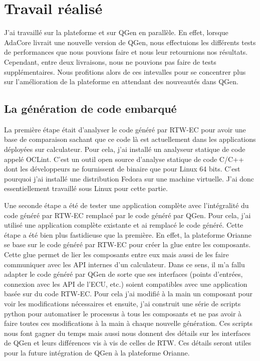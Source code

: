 \chapter{Travail réalisé}
J'ai travaillé sur la plateforme et sur QGen en parallèle.
En effet, lorsque AdaCore livrait une nouvelle version de QGen, nous effectuions
les différents tests de performances que nous pouvions faire et nous leur
retournions nos résultats. Cependant, entre deux livraisons, nous ne pouvions pas
faire de tests supplémentaires. Nous profitions alors de ces intevalles pour se
concentrer plus sur l'amélioration de la plateforme en attendant des nouveautés
dans QGen.

\section{La génération de code embarqué}
La première étape était d'analyser le code généré par RTW-EC\up{\circledR} pour
avoir une base de comparaison sachant que ce code là est actuellement dans les
applications déployées sur calculateur.
Pour cela, j'ai installé un analyseur statique de code appelé OCLint. C'est un
outil open source d'analyse statique de code C/C++ dont les développeurs ne
fournissent de binaire que
pour Linux 64 bits. C'est pourquoi j'ai installé une distribution Fedora sur une machine
virtuelle. J'ai donc essentiellement travaillé sous Linux pour cette partie.

Une seconde étape a été de tester une application complète avec l'intégralité du
code généré par RTW-EC\up{\circledR} remplacé par le code généré par QGen. Pour
cela, j'ai utilisé une application complète existante et ai remplacé le code
généré. Cette étape a été bien plus fastidieuse que la première. En effet, la
plateforme Orianne se base sur le code généré par RTW-EC\up{\circledR} pour
créer la \og glue \fg{} entre les composants. Cette glue permet de lier les
composants entre eux mais aussi de les faire communiquer avec les API internes d'un
calculateur. Dans ce sens, il m'a fallu adapter
le code généré par QGen de sorte que ses interfaces (points d'entrées, connexion
avec les API de l'ECU, etc.) soient compatibles avec une application basée sur du
code RTW-EC\up{\circledR}. Pour cela j'ai modifié à la main un composant pour
voir les modifications nécessaires et ensuite, j'ai construit une série de
scripts python pour automatiser le processus à tous les composants et ne pas
avoir à faire toutes ces modifications à la main à chaque nouvelle génération.
Ces scripts nous font gagner du temps mais aussi nous donnent des détails sur les
interfaces de QGen et leurs différences vis à vis de celles de RTW. Ces détails
seront utiles pour la future intégration de QGen à la plateforme Orianne.

